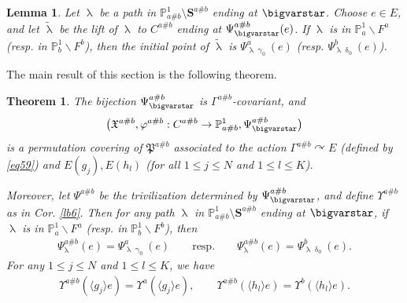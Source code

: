 \documentclass[12pt,a4paper,notitlepage]{article}
\theoremstyle{definition}
\theoremstyle{plain}
\newtheorem{thm}[df]{Theorem}
\newtheorem{lm}[df]{Lemma}
\newcommand{\fk}{\mathfrak}
\newcommand{\wtd}{\widetilde}
\newcommand{\bk}[1]{\langle {#1}\rangle}
\newcommand{\Pbb}{\mathbb P}
\newcommand{\Sbf}{\mathbf{S}}
\numberwithin{equation}{subsection}
\begin{document}
\begin{lm}\label{lb33}
Let $\uplambda$ be a path in $\Pbb^1_{a\#b}\setminus\Sbf^{a\#b}$ ending at $\bigvarstar$. Choose $e\in E$, and let $\wtd\uplambda$ be the lift of $\uplambda$ to $C^{a\#b}$ ending at $\Psi_\bigvarstar^{a\#b}(e)$. If $\uplambda$ is in $\Pbb^1_a\backslash F^a$ (resp. in $\Pbb^1_b\backslash F^b$), then the initial point of $\wtd\uplambda$ is $\Psi^a_{\uplambda\upgamma_0}(e)$ (resp. $\Psi^b_{\uplambda\updelta_0}(e)$).
\end{lm}



The main result of this section is the following theorem.

\begin{thm}\label{lb46}
The bijection $\Psi^{a\#b}_\bigvarstar$ is $\Gamma^{a\#b}$-covariant, and 
\begin{align*}
\big(\fk X^{a\#b},\varphi^{a\#b}:C^{a\#b}\rightarrow\Pbb^1_{a\#b},\Psi^{a\#b}_\bigvarstar\big)	
\end{align*}
is a permutation covering of $\fk P^{a\#b}$ associated to the action $\Gamma^{a\#b}\curvearrowright E$ (defined by \eqref{eq59}) and $E(g_j),E(h_l)$ (for all $1\leq j\leq N$ and $1\leq l\leq K$). 

Moreover, let $\Psi^{a\#b}$ be the trivilization determined by $\Psi^{a\#b}_\bigvarstar$, and define $\Upsilon^{a\#b}$ as in Cor. \ref{lb6}.  Then for any path $\uplambda$ in $\Pbb^1_{a\#b}\setminus\Sbf^{a\#b}$ ending at $\bigvarstar$, if $\uplambda$ is in $\Pbb^1_a\backslash F^a$ (resp. in $\Pbb^1_b\backslash F^b$), then
\begin{align}
\Psi_\uplambda^{a\#b}(e)=\Psi^a_{\uplambda\upgamma_0}(e)\qquad\text{resp.}\qquad\Psi_\uplambda^{a\#b}(e)=\Psi^b_{\uplambda\updelta_0}(e).\label{eq62}
\end{align}
For any $1\leq j\leq N$ and $1\leq l\leq K$, we have
\begin{align}
\Upsilon^{a\#b}(\bk{g_j}e)=\Upsilon^a(\bk{g_j}e),\qquad 	\Upsilon^{a\#b}(\bk{h_l}e)=\Upsilon^b(\bk{h_l}e).\label{eq63}
\end{align}
\end{thm}
\end{document}
